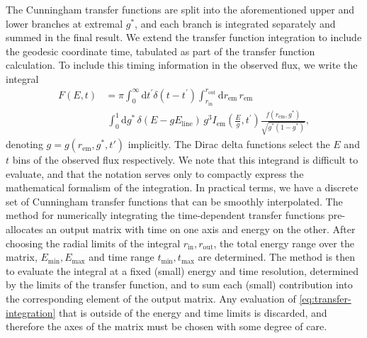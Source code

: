 \documentclass[fleqn,usenatbib]{mnras}
\renewcommand{\d}{\text{d}}
\newcommand{\rhoem}{r_\text{em}}
\begin{document}
The Cunningham transfer functions are split into the aforementioned upper and
lower branches at extremal $g^\ast$, and each branch is integrated separately
and summed in the final result. We extend the transfer function integration to
include the geodesic coordinate time, tabulated as part of the transfer function
calculation. To include this timing information in the observed flux, we write
the integral
\begin{align}
    \label{eq:transfer-integration}
    F(E, t) &=
    \pi
    \int_0^\infty \d t^\prime \delta(t - t^\prime)
    \int_{r_\text{in}}^{r_\text{out}} \d \rhoem\,\rhoem \nonumber \\
    &\ \int_0^1 \d g^\ast\, \delta(E - gE_\text{line})\, g^3 I_\text{em}\left(\frac{E}{g}, t^\prime\right) \frac{f(\rhoem, g^\ast)}{\sqrt{g^\ast (1 - g^\ast)}},
\end{align}
denoting $g = g( \rhoem, g^\ast, t')$ implicitly. The Dirac delta functions
select the $E$ and $t$ bins of the observed flux respectively. We note that this
integrand is difficult to evaluate, and that the notation serves only to
compactly express the mathematical formalism of the integration. In practical
terms, we have a discrete set of Cunningham transfer functions that can be
smoothly interpolated. The method for numerically integrating the time-dependent
transfer functions pre-allocates an output matrix with time on one axis and
energy on the other. After choosing the radial limits of the integral
$r_\text{in}, r_\text{out}$, the total energy range over the matrix,
$E_\text{min}, E_\text{max}$ and time range $t_\text{min}, t_\text{max}$ are
determined. The method is then to evaluate the integral at a fixed (small)
energy and time resolution, determined by the limits of the transfer function,
and to sum each (small) contribution into the corresponding element of the
output matrix.  Any evaluation of \eqref{eq:transfer-integration} that is
outside of the energy and time limits is discarded, and therefore the axes of
the matrix must be chosen with some degree of care.
\end{document}
